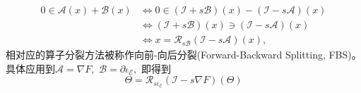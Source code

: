 \begin{align*}
0 \in \mathcal{A}(x) + \mathcal{B}(x) & \Longleftrightarrow 0 \in (\mathcal{I} + s\mathcal{B})(x) - (\mathcal{I} - s\mathcal{A})(x) \\
& \Longleftrightarrow (\mathcal{I} + s\mathcal{B})(x) \ni (\mathcal{I} - s\mathcal{A})(x) \\
& \Longleftrightarrow x = \mathcal{R}_{s\mathcal{B}}(\mathcal{I} - s\mathcal{A})(x),
\end{align*}
相对应的算子分裂方法被称作向前-向后分裂(Forward-Backward Splitting, FBS)。具体应用到$\mathcal{A} = \nabla F,$ $\mathcal{B} = \partial \iota_{\mathcal{E}},$ 即得到
\begin{equation*}
\Theta = \mathcal{R}_{s\iota_{\mathcal{E}}}(\mathcal{I} - s\nabla F)(\Theta)
\end{equation*}


